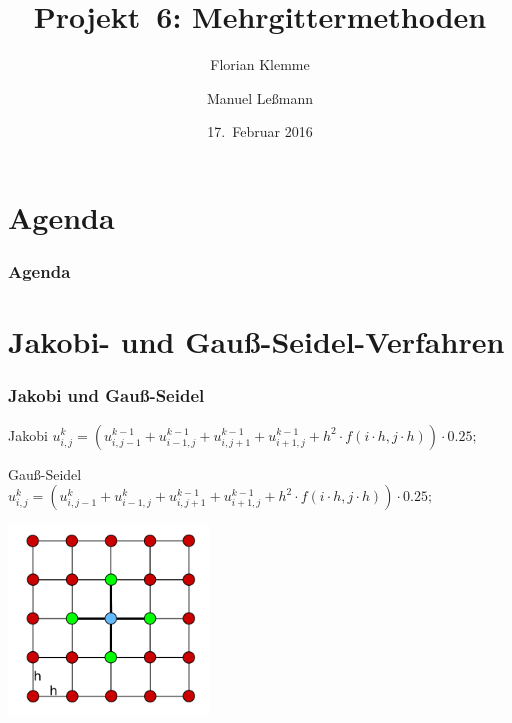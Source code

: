 \documentclass{beamer}
\begin{document}
\title{Projekt~6: Mehrgittermethoden}
\author{Florian Klemme \and Manuel Leßmann}
\date{17.~Februar 2016}

\begin{frame}
    \titlepage
\end{frame}

\section*{Agenda}
\begin{frame}
    \tableofcontents
    \frametitle{Agenda}
\end{frame}

\section{Jakobi- und Gauß-Seidel-Verfahren}
\begin{frame}
    \frametitle{Jakobi und Gauß-Seidel}
    \begin{block}{Jakobi}
        \(u_{i,j}^{k} = (u_{i,j-1}^{k-1} + u_{i-1,j}^{k-1}
                       + u_{i,j+1}^{k-1} + u_{i+1,j}^{k-1}
                       + h^2 \cdot f(i \cdot h, j \cdot h)) \cdot 0.25;\)
    \end{block}
    \begin{block}{Gauß-Seidel}
        \(u_{i,j}^{k} = (u_{i,j-1}^{k} + u_{i-1,j}^{k}
                       + u_{i,j+1}^{k-1} + u_{i+1,j}^{k-1}
                       + h^2 \cdot f(i \cdot h, j \cdot h)) \cdot 0.25;\)
    \end{block}
    \centering\includegraphics[width=0.4\textwidth]{jakobi-grid}
\end{frame}
\end{document}
